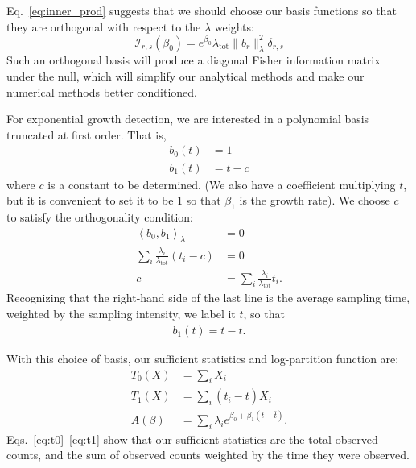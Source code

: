 \documentclass[12pt, letterpaper]{article}
\newcommand{ \lambtot }{\lambda_{\text{tot}}}
\begin{document}
Eq.~\ref{eq:inner_prod} suggests that we should choose our basis functions so that they are orthogonal with respect to the $\lambda$ weights:
\begin{equation}
    \mathcal{I}_{r,s}(\beta_0) = e^{\beta_0} \lambtot \| b_r \|_{\lambda}^2 \delta_{r,s}
    \label{eq:i_ortho}
\end{equation}
Such an orthogonal basis will produce a diagonal Fisher information matrix under the null, which will simplify our analytical methods and make our numerical methods better conditioned.

For exponential growth detection, we are interested in a polynomial basis truncated at first order.
That is,
\begin{align}
    b_0(t) &= 1 \\
    b_1(t) &= t - c
\end{align}
where $c$ is a constant to be determined.
(We also have a coefficient multiplying $t$, but it is convenient to set it to be 1 so that $\beta_1$ is the growth rate).
We choose $c$ to satisfy the orthogonality condition:
\begin{align}
    \left<b_0, b_1\right>_\lambda &= 0 \\
    \sum_i \frac{\lambda_i}{\lambtot} (t_i - c) &= 0 \\
    c &= \sum_i \frac{\lambda_i}{\lambtot} t_i.
\end{align}
Recognizing that the right-hand side of the last line is the average sampling time, weighted by the sampling intensity, we label it $\bar{t}$, so that
\begin{align}
    b_1(t) = t - \bar{t}.
\end{align}

With this choice of basis, our sufficient statistics and log-partition function are:
\begin{align}
    T_0(X) &= \sum_i X_i \label{eq:t0} \\
    T_1(X) &= \sum_i (t_i - \bar{t}) X_i \label{eq:t1} \\
    A(\beta) &= \sum_i \lambda_i e^{\beta_0 + \beta_1 (t - \bar{t})}.
\end{align}
Eqs.~\ref{eq:t0}--\ref{eq:t1} show that our sufficient statistics are the total observed counts, and the sum of observed counts weighted by the time they were observed.
\end{document}
